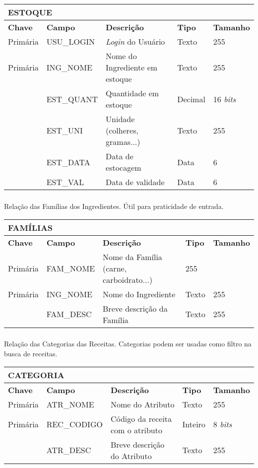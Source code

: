 \documentclass[a4paper]{article}
\begin{document}
\begin{center}
\begin{tabular}{ l  l  l  l l }
  \multicolumn{5}{l}{\textbf{ESTOQUE}} \\
  \hline
  \textbf{Chave} & \textbf{Campo} & \textbf{Descrição} & \textbf{Tipo} & \textbf{Tamanho} \\
  \cline{1-5}
  Primária & USU\_LOGIN & \emph{Login} do Usuário & Texto & 255 \\
  Primária & ING\_NOME & Nome do Ingrediente em estoque & Texto & 255 \\
   & EST\_QUANT & Quantidade em estoque & Decimal & 16 \emph{bits} \\
   & EST\_UNI & Unidade (colheres, gramas...) & Texto & 255 \\
   & EST\_DATA & Data de estocagem & Data & 6 \\
   & EST\_VAL & Data de validade & Data & 6
\end{tabular}
\end{center}

\vfill

\subsubsection{} Relação das Famílias dos Ingredientes. Útil para praticidade de entrada.

\begin{center}
\begin{tabular}{ l  l  l  l l }
  \multicolumn{5}{l}{\textbf{FAMÍLIAS}} \\
  \hline
  \textbf{Chave} & \textbf{Campo} & \textbf{Descrição} & \textbf{Tipo} & \textbf{Tamanho} \\
  \cline{1-5}
  Primária & FAM\_NOME & Nome da Família (carne, carboidrato...) & 255 \\
  Primária & ING\_NOME & Nome do Ingrediente & Texto & 255 \\
  & FAM\_DESC & Breve descrição da Família & Texto & 255
\end{tabular}
\end{center}

\newpage

\subsubsection{} Relação das Categorias das Receitas. Categorias podem ser usadas como filtro na busca de receitas.

\begin{center}
\begin{tabular}{ l  l  l  l l }
  \multicolumn{5}{l}{\textbf{CATEGORIA}} \\
  \hline
  \textbf{Chave} & \textbf{Campo} & \textbf{Descrição} & \textbf{Tipo} & \textbf{Tamanho} \\
  \cline{1-5}
  Primária & ATR\_NOME & Nome do Atributo & Texto & 255 \\
  Primária & REC\_CODIGO & Código da receita com o atributo & Inteiro & 8 \emph{bits} \\
   & ATR\_DESC & Breve descrição do Atributo & Texto & 255
\end{tabular}
\end{center}
\end{document}
